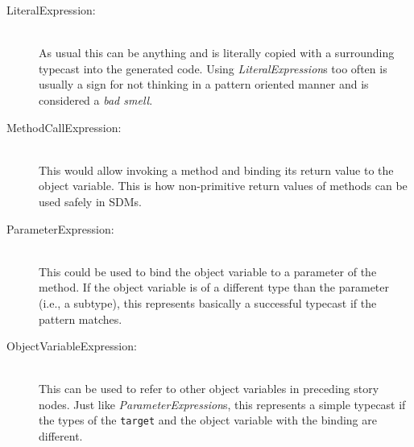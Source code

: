 \begin{description}
  
  \item[LiteralExpression:]~\\ 
  As usual this can be anything and is literally copied with a surrounding typecast 
  into the generated code.  Using \emph{LiteralExpression}s too often is usually a sign 
  for not thinking in a pattern oriented manner and is considered a \emph{bad smell}.
  
  \vspace{0.5cm}
  
  \item[MethodCallExpression:]~\\ 
  This would allow invoking a method and binding its return value to the object variable.  
  This is how non-primitive return values of methods can be used safely in SDMs.
  
  \vspace{0.5cm}
  
  \item[ParameterExpression:]~\\ 
  This could be used to bind the object variable to a parameter of the method.  
  If the object variable is of a different type than the parameter (i.e., a subtype), 
  this represents basically a successful typecast if the pattern matches.
  
  \newpage
  
  \item[ObjectVariableExpression:]~\\ 
  This can be used to refer to other object variables in preceding story nodes.  
  Just like \emph{ParameterExpression}s, this represents a simple typecast if the 
  types of the \texttt{target} and the object variable with the binding are different.

\end{description}

